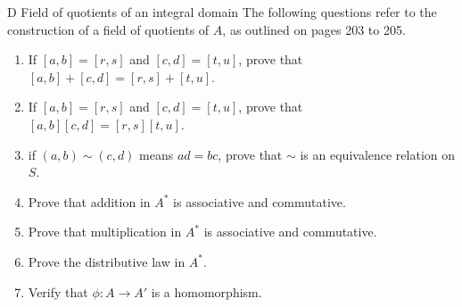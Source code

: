 \begin{exercise}{D Field of quotients of an integral domain}
The following questions refer to the construction of a field of quotients of $A$, as outlined on pages 203 to 205.
  \begin{enumerate}
      \item If $[a,b]=[r,s]$ and $[c,d]=[t,u]$, prove that $[a,b]+[c,d]=[r,s]+[t,u]$.
      \item If $[a,b]=[r,s]$ and $[c,d]=[t,u]$, prove that $[a,b][c,d]=[r,s][t,u]$.
      \item if $(a,b)\sim (c,d)$ means $ad=bc$, prove that $\sim$ is an equivalence relation on $S$.
      \item Prove that addition in $A^{*}$ is associative and commutative.
      \item Prove that multiplication in $A^{*}$ is associative and commutative.
      \item Prove the distributive law in $A^{*}$.
      \item Verify that $\phi:A\rightarrow A'$ is a homomorphism.
  \end{enumerate}
\end{exercise}
